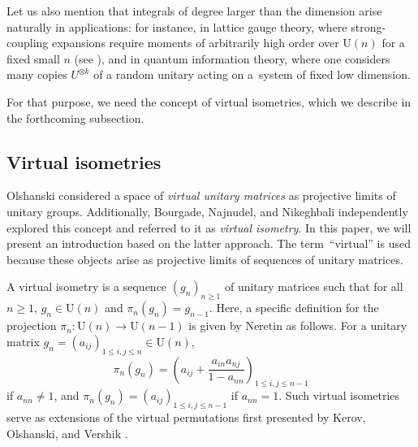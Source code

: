 \documentclass[10pt,a4paper]{amsart}
\numberwithin{equation}{section}
\theoremstyle{definition}
\newcommand{\UU}{\mathrm{U}}
\begin{document}
Let us also mention that integrals of degree larger than the dimension arise naturally in applications: for instance, in lattice gauge theory, where strong-coupling expansions require moments of arbitrarily high order over $\UU(n)$ for a fixed small $n$ (see \cite{MR597583}), and in quantum information theory, where one considers many copies $U^{\otimes k}$ of a random unitary acting on a~system of fixed low dimension.

For that purpose, we need the concept of virtual isometries, which we describe in the forthcoming subsection.


\subsection{Virtual isometries}


Olshanski \cite{Olshanski_unitary} considered a space of \emph{virtual unitary matrices} as projective limits of unitary groups.
Additionally, Bourgade, Najnudel, and Nikeghbali \cite{BNN} independently explored this concept and referred to it as \emph{virtual isometry}.
In this paper, we will present an introduction based on the latter approach.
 The term\ ``virtual'' is used because these objects arise as projective limits of sequences of unitary matrices.

A virtual isometry is a sequence $(g_n)_{n \ge 1}$ of unitary matrices
such that for all $n \ge 1$, $g_n \in \UU(n)$ and $\pi_{n}(g_{n})=g_{n-1}$.
Here, a specific definition for the projection $\pi_{n}\colon \UU(n) \to \UU(n-1)$ is given by Neretin \cite{Neretin} as follows.
For a unitary matrix $g_{n}= (a_{ij})_{1 \le i,j \le n} \in \UU(n)$,
\[
\pi_{n} (g_{n})= \left(a_{ij} + \frac{a_{in} a_{nj}}{1-a_{nn}} \right)_{1 \le i,j \le n-1}
\]
if $a_{nn} \not=1$,
and $\pi_{n} (g_{n})=(a_{ij})_{1 \le i,j \le n-1}$ if $a_{nn}=1$.
Such virtual isometries serve as extensions of the virtual permutations first presented by Kerov, Olshanski, and Vershik \cite{KOV1993, KOV2004}.
\end{document}
